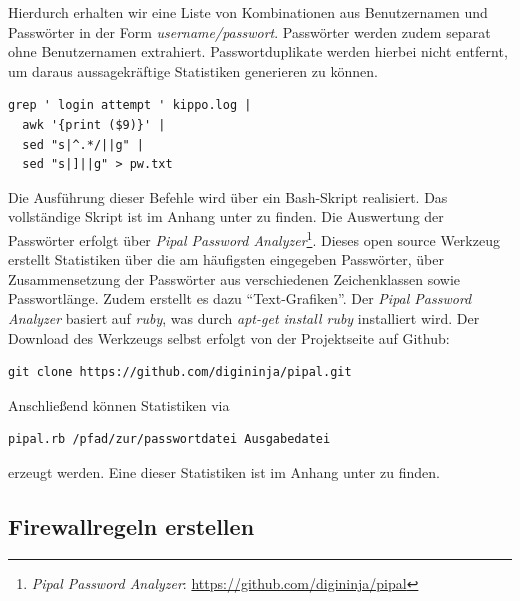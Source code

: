 Hierdurch erhalten wir eine Liste von Kombinationen aus Benutzernamen und Passwörter in der Form \textit{username/passwort}. Passwörter werden zudem separat ohne Benutzernamen extrahiert. Passwortduplikate werden hierbei nicht entfernt, um daraus aussagekräftige Statistiken generieren zu können.

\begin{lstlisting}[style=customc]
grep ' login attempt ' kippo.log |
  awk '{print ($9)}' |
  sed "s|^.*/||g" |
  sed "s|]||g" > pw.txt
\end{lstlisting}

Die Ausführung dieser Befehle wird über ein Bash-Skript realisiert. Das vollständige Skript ist im Anhang unter \textit{} zu finden.
Die Auswertung der Passwörter erfolgt über \textit{Pipal Password Analyzer}\footnote{ \textit{Pipal Password Analyzer}: \url{https://github.com/digininja/pipal}}. Dieses open source Werkzeug erstellt Statistiken über die am häufigsten eingegeben Passwörter, über Zusammensetzung der Passwörter aus verschiedenen Zeichenklassen sowie Passwortlänge. Zudem erstellt es dazu "`Text-Grafiken"'. Der \textit{Pipal Password Analyzer} basiert auf \textit{ruby}, was durch \textit{apt-get install ruby} installiert wird. Der Download des Werkzeugs selbst erfolgt von der Projektseite auf Github:

\begin{lstlisting}[style=customc]
git clone https://github.com/digininja/pipal.git
\end{lstlisting}

Anschließend können Statistiken via

\begin{lstlisting}[style=customc]
pipal.rb /pfad/zur/passwortdatei Ausgabedatei
\end{lstlisting}

erzeugt werden. Eine dieser Statistiken ist im Anhang unter \textit{} zu finden.


\subsection{Firewallregeln erstellen}
\label{subsec:Firewallregeln erstellen}

